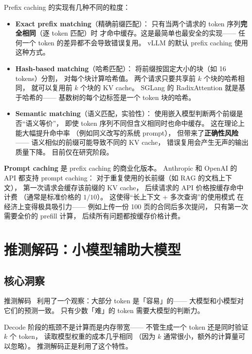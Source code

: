 Prefix caching 的实现有几种不同的粒度：
\begin{itemize}[noitemsep]
  \item \textbf{Exact prefix matching}（精确前缀匹配）：
        只有当两个请求的 token 序列\textbf{完全相同}（逐 token 匹配）时
        才命中缓存。这是最简单也最安全的实现——
        任何一个 token 的差异都不会导致错误复用。
        vLLM 的默认 prefix caching 使用这种方式。
  \item \textbf{Hash-based matching}（哈希匹配）：
        将前缀按固定大小的块（如 16 tokens）分割，
        对每个块计算哈希值。
        两个请求只要共享前 $k$ 个块的哈希相同，
        就可以复用前 $k$ 个块的 KV cache。
        SGLang 的 RadixAttention 就是基于哈希的——
        基数树的每个边标签是一个 token 块的哈希。
  \item \textbf{Semantic matching}（语义匹配，实验性）：
        使用嵌入模型判断两个前缀是否``语义等价''，
        即使 token 序列不同但含义相同时也命中缓存。
        这在理论上能大幅提升命中率
        （例如同义改写的系统 prompt），
        但带来了\textbf{正确性风险}——
        语义相似的前缀可能导致不同的 KV cache，
        错误复用会产生无声的输出质量下降。
        目前仅在研究阶段。
\end{itemize}

\textbf{Prompt caching} 是 prefix caching 的商业化版本。
Anthropic 和 OpenAI 的 API 都支持 prompt caching：
对于重复使用的长前缀（如 RAG 的文档上下文），
第一次请求会缓存该前缀的 KV cache，
后续请求的 API 价格按缓存命中计费
（通常是标准价格的 $1/10$）。
这使得``长上下文 + 多次查询''的使用模式
在经济上变得极具吸引力——
例如上传一份 100 页的合同后多次提问，
只有第一次需要全价的 prefill 计算，
后续所有问题都按缓存价格计费。


\section{推测解码：小模型辅助大模型}

\subsection{核心洞察}

推测解码~\cite{leviathan2023speculative}
利用了一个观察：大部分 token 是「容易」的——
大模型和小模型对它们的预测一致。
只有少数「难」的 token 需要大模型的判断力。

Decode 阶段的瓶颈不是计算而是内存带宽——
不管生成一个 token 还是同时验证 $k$ 个 token，
读取模型权重的成本几乎相同
（因为 $k$ 通常很小，额外的计算量可以忽略）。
推测解码正是利用了这个特性。

